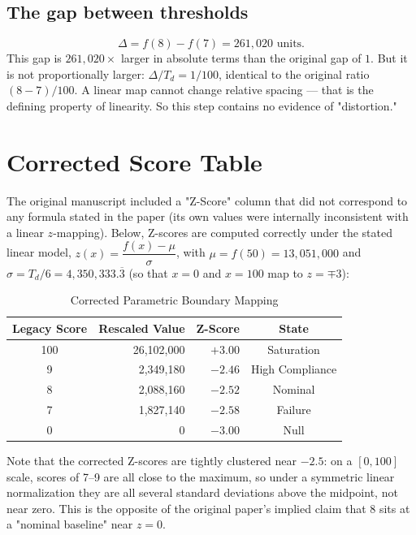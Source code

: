 \documentclass[10pt,journal,compsoc]{IEEEtran}
\begin{document}
\subsection{The gap between thresholds}
\begin{equation}
    \Delta = f(8) - f(7) = 261{,}020 \text{ units}.
\end{equation}
This gap is $261{,}020\times$ larger in absolute terms than the original gap of $1$. But it is not proportionally larger: $\Delta / T_d = 1/100$, identical to the original ratio $(8-7)/100$. A linear map cannot change relative spacing — that is the defining property of linearity. So this step contains no evidence of "distortion."

\section{Corrected Score Table}
The original manuscript included a "Z-Score" column that did not correspond to any formula stated in the paper (its own values were internally inconsistent with a linear $z$-mapping). Below, Z-scores are computed correctly under the stated linear model, $z(x) = \dfrac{f(x) - \mu}{\sigma}$, with $\mu = f(50) = 13{,}051{,}000$ and $\sigma = T_d/6 = 4{,}350{,}333.\overline{3}$ (so that $x=0$ and $x=100$ map to $z=\mp 3$):

\begin{table}[h]
\centering
\caption{Corrected Parametric Boundary Mapping}
\begin{tabular}{crrc}
\toprule
\textbf{Legacy Score} & \textbf{Rescaled Value} & \textbf{Z-Score} & \textbf{State} \\
\midrule
100 & 26,102,000 & $+3.00$ & Saturation \\
9   & 2,349,180  & $-2.46$ & High Compliance \\
8   & 2,088,160  & $-2.52$ & Nominal \\
7   & 1,827,140  & $-2.58$ & Failure \\
0   & 0          & $-3.00$ & Null \\
\bottomrule
\end{tabular}
\end{table}

Note that the corrected Z-scores are tightly clustered near $-2.5$: on a $[0,100]$ scale, scores of 7--9 are all close to the maximum, so under a symmetric linear normalization they are all several standard deviations above the midpoint, not near zero. This is the opposite of the original paper's implied claim that 8 sits at a "nominal baseline" near $z=0$.
\end{document}
